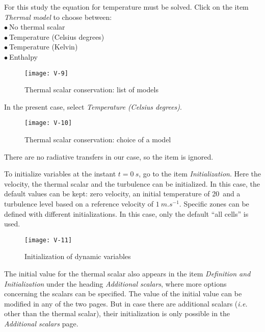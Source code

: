 \clearpage
For this study the equation for temperature must be solved. Click on the item
{\itshape Thermal model} to
choose between:\\
\hspace*{1cm}$\bullet\ $No thermal scalar\\
\hspace*{1cm}$\bullet\ $Temperature (Celsius degrees)\\
\hspace*{1cm}$\bullet\ $Temperature (Kelvin)\\
\hspace*{1cm}$\bullet\ $Enthalpy

\begin{figure}[ht]
\begin{center}
\texttt{[image: V-9]}
\caption{Thermal scalar conservation: list of models}
\label{fig11_e1}
\end{center}
\end{figure}


\clearpage
In the present case, select {\itshape Temperature (Celsius degrees)}.
\begin{figure}[ht]
\begin{center}
\texttt{[image: V-10]}
\caption{Thermal scalar conservation: choice of a model}
\label{fig12_e1}
\end{center}
\end{figure}

There are no radiative transfers in our case, so the item is ignored.

\clearpage
To initialize variables at the instant $t=0\ s$, go to the item {\itshape Initialization}.
Here the velocity, the thermal scalar and the turbulence can be initialized. In
this case, the default values can be kept: zero velocity, an initial temperature
of 20\degresC\ and a turbulence level based on a reference velocity of $1\
m.s^{-1}$. Specific zones can be defined with different initializations. In this
case, only the default ``all cells'' is used.

\begin{figure}[ht]
\begin{center}
\texttt{[image: V-11]}
\caption{Initialization of dynamic variables}
\label{fig14_e1}
\end{center}
\end{figure}


\clearpage
The initial value for the thermal scalar also appears in the item
{\itshape Definition and Initialization} under the heading
{\itshape Additional scalars}, where more options concerning the scalars can be
specified. The value of the initial value can be modified in any of the two
pages. But in case there are additional scalars ({\em i.e.} other than the
thermal scalar), their initialization is only possible in the {\itshape
Additional scalars} page.

